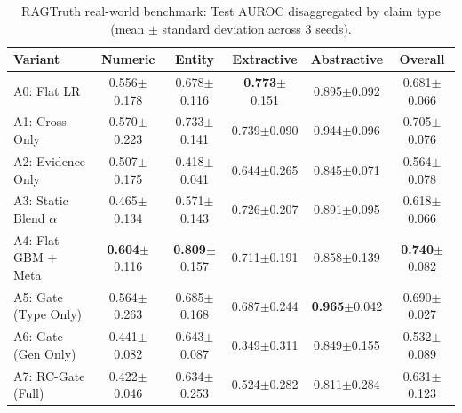 \documentclass[pdflatex,sn-mathphys,Numbered]{sn-jnl}
\begin{document}
\begin{table}[htbp]
\caption{RAGTruth real-world benchmark: Test AUROC disaggregated by claim type (mean $\pm$ standard deviation across 3 seeds).}\label{tab:rag_type}
\footnotesize
\setlength{\tabcolsep}{3.5pt}
\begin{tabular}{@{}lccccc@{}}
\toprule
\textbf{Variant} & \textbf{Numeric} & \textbf{Entity} & \textbf{Extractive} & \textbf{Abstractive} & \textbf{Overall} \\
\midrule
A0: Flat LR & 0.556$\pm$0.178 & 0.678$\pm$0.116 & \textbf{0.773}$\pm$0.151 & 0.895$\pm$0.092 & 0.681$\pm$0.066 \\
A1: Cross Only & 0.570$\pm$0.223 & 0.733$\pm$0.141 & 0.739$\pm$0.090 & 0.944$\pm$0.096 & 0.705$\pm$0.076 \\
A2: Evidence Only & 0.507$\pm$0.175 & 0.418$\pm$0.041 & 0.644$\pm$0.265 & 0.845$\pm$0.071 & 0.564$\pm$0.078 \\
A3: Static Blend $\alpha$ & 0.465$\pm$0.134 & 0.571$\pm$0.143 & 0.726$\pm$0.207 & 0.891$\pm$0.095 & 0.618$\pm$0.066 \\
A4: Flat GBM + Meta & \textbf{0.604}$\pm$0.116 & \textbf{0.809}$\pm$0.157 & 0.711$\pm$0.191 & 0.858$\pm$0.139 & \textbf{0.740}$\pm$0.082 \\
A5: Gate (Type Only) & 0.564$\pm$0.263 & 0.685$\pm$0.168 & 0.687$\pm$0.244 & \textbf{0.965}$\pm$0.042 & 0.690$\pm$0.027 \\
A6: Gate (Gen Only) & 0.441$\pm$0.082 & 0.643$\pm$0.087 & 0.349$\pm$0.311 & 0.849$\pm$0.155 & 0.532$\pm$0.089 \\
A7: RC-Gate (Full) & 0.422$\pm$0.046 & 0.634$\pm$0.253 & 0.524$\pm$0.282 & 0.811$\pm$0.284 & 0.631$\pm$0.123 \\
\bottomrule
\end{tabular}
\end{table}
\end{document}
